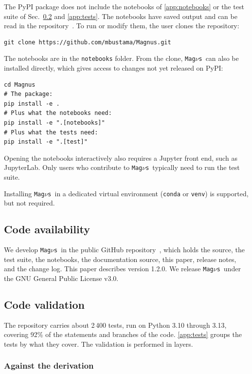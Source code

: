 \documentclass[final,5p,times,twocolumn,sort,compress]{elsarticle}
\makeatletter
\DeclareRobustCommand{\_}{%
  \ifmmode\nfss@text{\textunderscore}\else\textunderscore\allowbreak\fi}
\newcommand{\magnus}{{\tt Mag}\ensuremath{\nu}{\tt s}}
\makeatother
\begin{document}
The PyPI package does not include the notebooks of \ref{app:notebooks} or the test suite of Sec.~\ref{sec:validation} and \ref{app:tests}. The notebooks have saved output and can be read in the repository~\cite{Magnus}. To run or modify them, the user clones the repository:
\begin{verbatim}
git clone https://github.com/mbustama/Magnus.git
\end{verbatim}
The notebooks are in the {\tt notebooks} folder. From the clone, \magnus\ can also be installed directly, which gives access to changes not yet released on PyPI:
\begin{verbatim}
cd Magnus
# The package:
pip install -e .                 
# Plus what the notebooks need:
pip install -e ".[notebooks]"    
# Plus what the tests need:
pip install -e ".[test]"         
\end{verbatim}
Opening the notebooks interactively also requires a Jupyter front end, such as JupyterLab. Only users who contribute to \magnus\ typically need to run the test suite.

Installing \magnus\ in a dedicated virtual environment ({\tt conda} or {\tt venv}) is supported, but not required.


\subsection{Code availability}

We develop \magnus\ in the public GitHub repository\ \cite{Magnus}, which holds the source, the test suite, the notebooks, the documentation source, this paper, release notes, and the change log. This paper describes version 1.2.0. We release \magnus\ under the GNU General Public License v3.0. 


\subsection{Code validation}
\label{sec:validation}

The repository carries about 2\,400 tests, run on Python 3.10 through 3.13, covering 92\% of the statements and branches of the code. \ref{app:tests} groups the tests by what they cover. The validation is performed in layers.

\subsubsection{Against the derivation}
\end{document}
